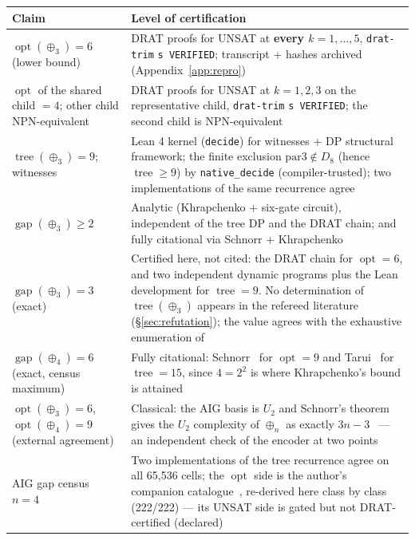 \documentclass[11pt]{article}
\DeclareMathOperator{\opt}{opt}
\DeclareMathOperator{\tree}{tree}
\DeclareMathOperator{\gapop}{gap}
\theoremstyle{plain}
\begin{document}
\begin{table}[h]
\centering
\begin{tabularx}{\textwidth}{@{}p{}Y@{}}
\toprule
Claim & Level of certification \\
\midrule
$\opt(\oplus_3) = 6$ (lower bound) &
DRAT proofs for UNSAT at \textbf{every $k = 1,\dots,5$}, \texttt{drat-trim} \texttt{s VERIFIED};
transcript + hashes archived (Appendix~\ref{app:repro}) \\
\addlinespace
$\opt$ of the shared child $= 4$; other child NPN-equivalent &
DRAT proofs for UNSAT at $k = 1,2,3$ on the representative child, \texttt{drat-trim}
\texttt{s VERIFIED}; the second child is NPN-equivalent \\
\addlinespace
$\tree(\oplus_3) = 9$; witnesses &
Lean 4 kernel (\texttt{decide}) for witnesses + DP structural framework; the finite exclusion
$\mathrm{par3} \notin D_8$ (hence $\tree \ge 9$) by \texttt{native\_decide} (compiler-trusted); two
implementations of the same recurrence agree \\
\addlinespace
$\gapop(\oplus_3) \ge 2$ &
Analytic (Khrapchenko + six-gate circuit), independent of the tree DP and the DRAT chain; and
fully citational via Schnorr + Khrapchenko \\
\addlinespace
$\gapop(\oplus_3) = 3$ (exact) &
Certified here, not cited: the DRAT chain for $\opt = 6$, and two independent dynamic programs
plus the Lean development for $\tree = 9$. No determination of $\tree(\oplus_3)$ appears in the
refereed literature (\S\ref{sec:refutation}); the value agrees with the exhaustive enumeration
of~\cite{cox2011} \\
\addlinespace
$\gapop(\oplus_4) = 6$ (exact, census maximum) &
Fully citational: Schnorr~\cite{schnorr1976} for $\opt = 9$ and Tarui~\cite{tarui2010} for
$\tree = 15$, since $4 = 2^2$ is where Khrapchenko's bound is attained \\
\addlinespace
$\opt(\oplus_3) = 6$, $\opt(\oplus_4) = 9$ (external agreement) &
Classical: the AIG basis is $U_2$ and Schnorr's theorem gives the $U_2$ complexity of $\oplus_n$ as
exactly $3n-3$~\cite{schnorr1976} --- an independent check of the encoder at two points \\
\addlinespace
AIG gap census $n = 4$ &
Two implementations of the tree recurrence agree on all 65{,}536 cells; the $\opt$ side is the
author's companion catalogue~\cite{krinkin-catalog}, re-derived here class by class (222/222) --- its UNSAT
side is gated but not DRAT-certified (declared) \\

\end{tabularx}
\end{table}
\end{document}
